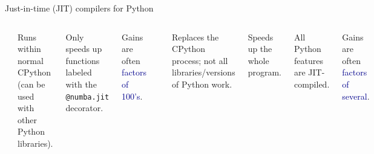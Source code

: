\documentclass[aspectratio=169]{beamer}
\begin{document}
\begin{frame}{Just-in-time (JIT) compilers for Python}
\large

\begin{columns}
\begin{center}
\includegraphics[width=0.75\linewidth]{numba-logo.png}
\end{center}

Runs within normal CPython (can be used with other Python libraries).

\vspace{0.2 cm}

Only speeds up functions labeled with the \texttt{@numba.jit} decorator.

\vspace{0.2 cm}


\vspace{0.2 cm}

Gains are often \textcolor{darkblue}{factors of 100's}.

\begin{center}
\includegraphics[width=0.75\linewidth]{pypy-logo.jpg}
\end{center}

Replaces the CPython process; not all libraries/versions of Python work.

\vspace{0.2 cm}

Speeds up the whole program. \mbox{\hspace{4 cm}}

\vspace{0.2 cm}

All Python features are JIT-compiled. \mbox{\hspace{4 cm}}

\vspace{0.2 cm}

Gains are often \textcolor{darkblue}{factors of several}.

\end{columns}
\end{frame}
\end{document}
